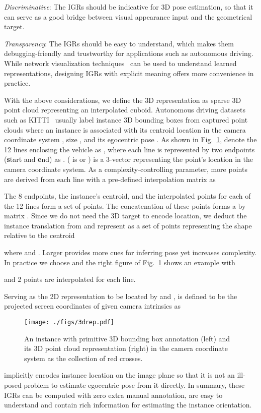 \documentclass[final]{cvpr}
\begin{document}
\noindent \emph{Discriminative}: The IGRs should be indicative for 3D pose estimation, so that it can serve as a good bridge between visual appearance input and the geometrical target.

\noindent \emph{Transparency}: The IGRs should be easy to understand, which makes them debugging-friendly and trustworthy for applications such as autonomous driving. While network visualization techniques~\cite{simonyan2013deep, li2019visualizing, li2019facial} can be used to understand learned representations, designing IGRs with explicit meaning offers more convenience in practice.


With the above considerations, we define the 3D representation   as sparse 3D point cloud representing an interpolated cuboid. Autonomous driving datasets such as KITTI~\cite{geiger2012we} usually label instance 3D bounding boxes from captured point clouds where an instance  is associated with its centroid location in the camera coordinate system , size , and its egocentric pose . As shown in Fig.~\ref{fig:3drep}, denote the 12 lines enclosing the vehicle as , where each line is represented by two endpoints (\textbf{s}tart and \textbf{e}nd) as .   ( is  or ) is a 3-vector  representing the point's location in the camera coordinate system. As a complexity-controlling parameter,  more points are derived from each line with a pre-defined interpolation matrix  as
 
The 8 endpoints, the instance's centroid, and the interpolated points for each of the 12 lines form a set of  points. The concatenation of these points forms a  by  matrix . Since we do not need the 3D target  to encode location, we deduct the instance translation  from  and represent  as a set of  points representing the shape relative to the centroid  

where  and .
Larger  provides more cues for inferring pose yet increases complexity. In practice we choose  and the right figure of Fig.~\ref{fig:3drep} shows an example with 

and 2 points are interpolated for each line.

Serving as the 2D representation to be located by  and ,  is defined to be the projected screen coordinates of  given camera intrinsics  as

\begin{figure}[t]
	\begin{center}
		\texttt{[image: ./figs/3drep.pdf]}
	\end{center}
	\caption{An instance  with primitive 3D bounding box annotation (left) and its 3D point cloud representation  (right) in the camera coordinate system as the collection of red crosses.}
	\label{fig:3drep}
\end{figure}
 implicitly encodes instance location on the image plane so that it is not an ill-posed problem to estimate egocentric pose from it directly. In summary, these IGRs can be computed with zero extra manual annotation, are easy to understand and contain rich information for estimating the instance orientation.
\end{document}
